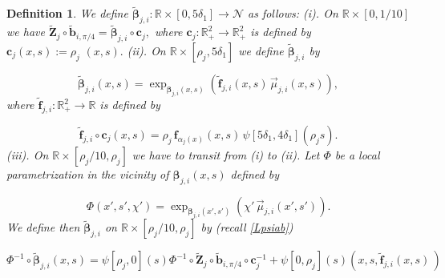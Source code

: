 \documentclass[12pt,namelimits,sumlimits]{amsart}
\newtheorem{definition}[theorem]{Definition}
\theoremstyle{remark}
\numberwithin{equation}{section}
\begin{document}
\addtocounter{equation}{1}
\begin{definition}
\label{Dbbeti}
We define 
${\widetilde{\boldsymbol{\beta}}}_{j,i}:{\mathbb{R}}\times[0,5\delta_1]\to{{\mathcal{N}}}$
as follows:
\newline
(i).
On ${\mathbb{R}}\times[0,1/10]$ we have
$
{\widetilde{\boldsymbol{Z}}}_j\circ {\widetilde{\boldsymbol{b}}}_{i,\pi/4}={\widetilde{\boldsymbol{\beta}}}_{j,i}\circ{\boldsymbol{c}}_j,
$
where ${\boldsymbol{c}}_j:{{{\mathbb{R}}^2_+}}\to{{{\mathbb{R}}^2_+}}$ is defined by
$
{\boldsymbol{c}}_j(x,s):=\rho_j\,\,(x,s).
$
\newline
(ii).
On ${\mathbb{R}}\times[\rho_j,5\delta_1]$
we define 
${\widetilde{\boldsymbol{\beta}}}_{j,i}$ by
\addtocounter{theorem}{1}
\begin{equation}
\label{Ebbeti}
{\widetilde{\boldsymbol{\beta}}}_{j,i} (x,s)=\exp_{{\boldsymbol{\beta}}_{j,i}(x,s)}
\left(
{\widetilde{\boldsymbol{f}}}_{j,i}(x,s)\,{\vec{\mu}}_{j,i}(x,s)
\right),
\end{equation}
where ${\widetilde{\boldsymbol{f}}}_{j,i}:{{{\mathbb{R}}^2_+}}\to{\mathbb{R}}$ is defined by
\addtocounter{theorem}{1}
\begin{equation}
\label{Efftipp}
{\widetilde{\boldsymbol{f}}}_{j,i}\circ{\boldsymbol{c}}_j(x,s)=
\rho_j\,
\boldsymbol{f}_{\alpha_j(x)} ( x, s)
\,
\psi[5\delta_1,4\delta_1](\rho_j s).
\end{equation}
(iii).
On ${\mathbb{R}}\times[\rho_j/10,\rho_j]$
we have to transit from (i) to (ii).
Let $\Phi$ be a local parametrization in the vicinity of 
${\boldsymbol{\beta}}_{j,i}(x,s)$ defined by
\addtocounter{theorem}{1}
\begin{equation}
\label{EPhi}
\Phi(x',s',\chi')=
\exp_{{\boldsymbol{\beta}}_{j,i}(x',s')}
(
\chi'\,{\vec{\mu}}_{j,i}(x',s')
).
\end{equation}
We define then
${\widetilde{\boldsymbol{\beta}}}_{j,i}$ on ${\mathbb{R}}\times[\rho_j/10,\rho_j]$ 
by (recall \ref{Lpsiab})
\addtocounter{theorem}{1}
\begin{equation}
\label{Ebbeti3}
\Phi^{-1}\circ{\widetilde{\boldsymbol{\beta}}}_{j,i}(x,s)=
\psi[\rho_j,0](s)\Phi^{-1}\circ
{\widetilde{\boldsymbol{Z}}}_j\circ {\widetilde{\boldsymbol{b}}}_{i,\pi/4}\circ{\boldsymbol{c}}_j^{-1}+
\psi[0,\rho_j](s)(x,s,{\widetilde{\boldsymbol{f}}}_{j,i}(x,s)\,)
\end{equation}
\end{definition}
\end{document}
